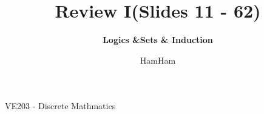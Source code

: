 \documentclass[xcolor=table]{beamer}
\title{\sffamily Review I(Slides 11 - 62)}
\subtitle{\textbf{Logics \&Sets \& Induction}\\}
\institute[UM-SJTU JI]{University of Michigan-Shanghai Jiao Tong University Joint Institute}
\author{HamHam}
\newcommand{\myfont}{\rmfamily\normalsize\upshape\mdseries}
\begin{document}
\begin{titlepage}
    \begin{center}
        VE203 - Discrete Mathmatics 
    \end{center}
\end{titlepage}
\myfont
\end{document}
